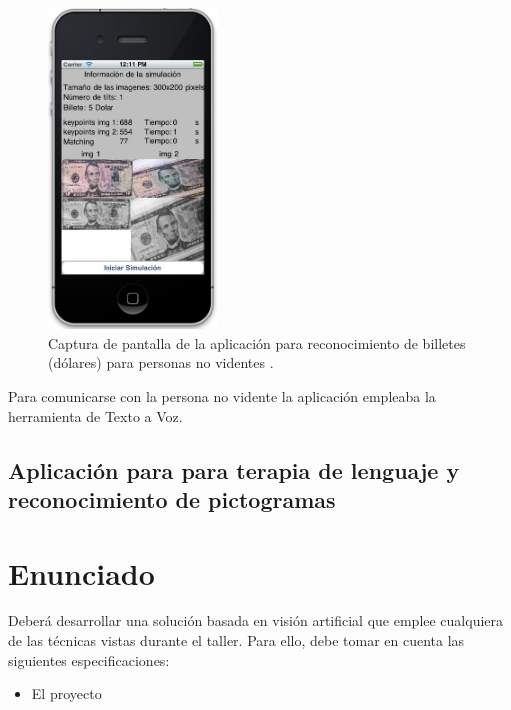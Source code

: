 \documentclass[a4paper,10pt]{article}
\begin{document}
\begin{figure}[th!]
	\centering
	\includegraphics[width = 0.4\textwidth]{images/ReconocimientoBilletesEjemplo.png}
	\caption{Captura de pantalla de la aplicación para reconocimiento de billetes (dólares) para personas no videntes \cite{plaza2011estudio}.}
	\label{Fig:ReconocimientoBilletes}
\end{figure}


Para comunicarse con la persona no vidente la aplicación empleaba la herramienta de Texto a Voz.


\subsection{Aplicación para para terapia de lenguaje y reconocimiento de pictogramas}




\cite{yacchirema2018fall}



\section{Enunciado}

Deberá desarrollar una solución basada en visión artificial que emplee cualquiera de las técnicas vistas durante el taller. Para ello, debe tomar en cuenta las siguientes especificaciones:

\begin{itemize}
	\item El proyecto 
\end{itemize}
\end{document}
